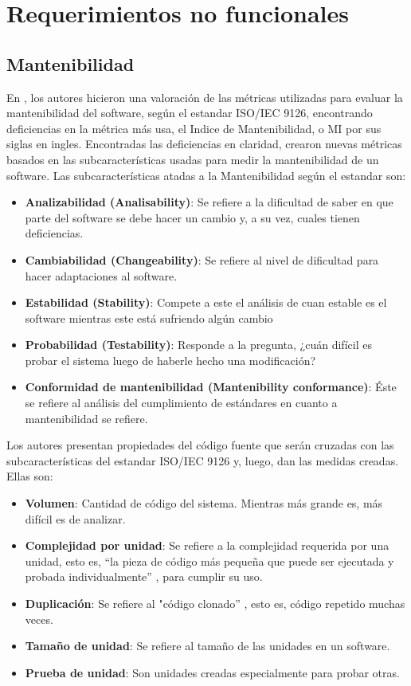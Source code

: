 \section{Requerimientos no funcionales}
\subsection{Mantenibilidad}

En \cite{measuring_maintainability}, los autores hicieron una valoración de las métricas utilizadas para evaluar la mantenibilidad del software, según el estandar ISO/IEC 9126, encontrando deficiencias en la métrica más usa, el Indice de Mantenibilidad, o MI por sus siglas en ingles. Encontradas las deficiencias en claridad, crearon nuevas métricas basados en las subcaracterísticas usadas para medir la mantenibilidad de un software. Las subcaracterísticas atadas a la Mantenibilidad según el estandar son:

\begin{itemize}
 \item \textbf{Analizabilidad (Analisability)}: Se refiere a la dificultad de saber en que parte del software se debe hacer un cambio y, a su vez, cuales tienen deficiencias.
 \item \textbf{Cambiabilidad (Changeability)}: Se refiere al nivel de dificultad para hacer adaptaciones al software.
 \item \textbf{Estabilidad (Stability)}: Compete a este el análisis de cuan estable es el software mientras este está sufriendo algún cambio
 \item \textbf{Probabilidad (Testability)}: Responde a la pregunta, ¿cuán difícil es probar el sistema luego de haberle hecho una modificación?
 \item \textbf{Conformidad de mantenibilidad (Mantenibility conformance)}: Éste se refiere al análisis del cumplimiento de estándares en cuanto a mantenibilidad se refiere.
\end{itemize}

Los autores presentan propiedades del código fuente que serán cruzadas con las subcaracterísticas del estandar ISO/IEC 9126 y, luego, dan las medidas creadas. Ellas son:

\begin{itemize}
 \item \textbf{Volumen}: Cantidad de código del sistema. Mientras más grande es, más difícil es de analizar.
 \item \textbf{Complejidad por unidad}: Se refiere a la complejidad requerida por una unidad, esto es, “la pieza de código más pequeña que puede ser ejecutada y probada individualmente” \cite{measuring_maintainability}, para cumplir su uso.
 \item \textbf{Duplicación}: Se refiere al "código clonado” \cite{measuring_maintainability}, esto es, código repetido muchas veces.
 \item \textbf{Tamaño de unidad}: Se refiere al tamaño de las unidades en un software.
 \item \textbf{Prueba de unidad}: Son unidades creadas especialmente para probar otras.
\end{itemize}


